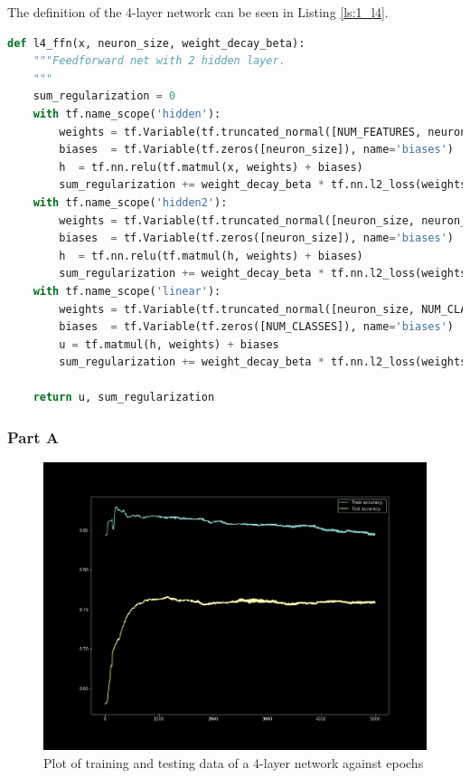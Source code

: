The definition of the 4-layer network can be seen in Listing \ref{ls:1_l4}.

\begin{lstlisting}[language=Python, caption=4-layer feed forward network, label=ls:1_l4]
def l4_ffn(x, neuron_size, weight_decay_beta):
    """Feedforward net with 2 hidden layer.
    """
    sum_regularization = 0
    with tf.name_scope('hidden'):
        weights = tf.Variable(tf.truncated_normal([NUM_FEATURES, neuron_size], stddev=1.0/math.sqrt(float(NUM_FEATURES))), name='weights')
        biases  = tf.Variable(tf.zeros([neuron_size]), name='biases')
        h  = tf.nn.relu(tf.matmul(x, weights) + biases)
        sum_regularization += weight_decay_beta * tf.nn.l2_loss(weights)
    with tf.name_scope('hidden2'):
        weights = tf.Variable(tf.truncated_normal([neuron_size, neuron_size], stddev=1.0/math.sqrt(float(neuron_size))), name='weights')
        biases  = tf.Variable(tf.zeros([neuron_size]), name='biases')
        h  = tf.nn.relu(tf.matmul(h, weights) + biases)
        sum_regularization += weight_decay_beta * tf.nn.l2_loss(weights)
    with tf.name_scope('linear'):
        weights = tf.Variable(tf.truncated_normal([neuron_size, NUM_CLASSES], stddev=1.0/math.sqrt(float(neuron_size))), name='weights')
        biases  = tf.Variable(tf.zeros([NUM_CLASSES]), name='biases')
        u = tf.matmul(h, weights) + biases
        sum_regularization += weight_decay_beta * tf.nn.l2_loss(weights)
    
    return u, sum_regularization
\end{lstlisting}

\subsubsection{Part A}

\begin{figure}[H]
    \centering
    \includegraphics[width=0.8\linewidth]{assets/plots/part1_Q5a.png}
    \caption{Plot of training and testing data of a 4-layer network against epochs}
    \label{fig:5a}
\end{figure}

